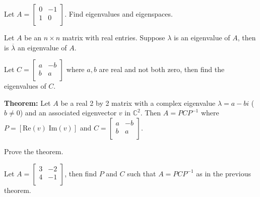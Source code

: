 \documentclass[12pt,letterpaper]{article}
\begin{document}
\newpage


\begin{enumerate}

\Problem Let $A=\begin{bmatrix} 0 & -1\\ 1 & 0\\ \end{bmatrix}$. Find eigenvalues and eigenspaces.

\vfill

\Problem Let $A$ be an $n \times n$ matrix with real entries. Suppose $\lambda$ is an eigenvalue of $A$, then is $\overline{\lambda}$ an eigenvalue of $A$.

\vfill

\newpage

\Problem Let $C=\begin{bmatrix} a & -b \\ b & a\\ \end{bmatrix}$ where $a, b$ are real and not both zero, then find the eigenvalues of $C$.

\vfill

{\bf Theorem:} Let $A$ be a real 2 by 2 matrix with a complex eigenvalue $\lambda=a-bi$ ($b\neq0$) and an associated eigenvector $v$ in $\mathbb{C}^2$. Then $A=PCP^{-1}$ where $P=[ \text{Re}(v) \; \text{Im}(v) ]$ and $C=\begin{bmatrix} a & -b\\ b & a\\ \end{bmatrix}$.

\Problem Prove the theorem.

\vfill

\newpage

\Problem Let $A=\begin{bmatrix} 3 & -2\\ 4 & -1\\ \end{bmatrix}$, then find $P$ and $C$ such that $A=PCP^{-1}$ as in the previous theorem.





\end{enumerate}
\end{document}
